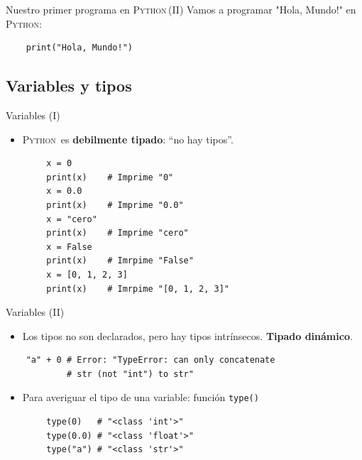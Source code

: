 \documentclass[10pt]{beamer} %
\newcommand{\py}{\textsc{Python}}
\begin{document}
\begin{frame}[fragile]{Nuestro primer programa en \py\,(II)}
    Vamos a programar "Hola, Mundo!" en \py:
    \begin{verbatim}
    print("Hola, Mundo!")
    \end{verbatim}
\end{frame}

\subsection{Variables y tipos}
\begin{frame}[fragile]{Variables (I)}
    \begin{itemize}
        \item \py\, es \textbf{debilmente tipado}: ``no hay tipos''.
    \end{itemize}
    \begin{verbatim}
        x = 0
        print(x)    # Imprime "0"
        x = 0.0
        print(x)    # Imprime "0.0"
        x = "cero"
        print(x)    # Imprime "cero"
        x = False
        print(x)    # Imrpime "False"
        x = [0, 1, 2, 3]
        print(x)    # Imrpime "[0, 1, 2, 3]"
    \end{verbatim}
\end{frame}

\begin{frame}[fragile]{Variables (II)}
    \begin{itemize}
        \item Los tipos no son declarados, pero hay tipos intrínsecos. \textbf{Tipado dinámico}.
    \end{itemize}
    \begin{verbatim}
    "a" + 0 # Error: "TypeError: can only concatenate
            # str (not "int") to str"
    \end{verbatim}
    \begin{itemize}
        \item Para averiguar el tipo de una variable: función \texttt{type()}
    \end{itemize}
    \begin{verbatim}
        type(0)   # "<class 'int'>"
        type(0.0) # "<class 'float'>"
        type("a") # "<class 'str'>"
    \end{verbatim}
\end{frame}
\end{document}
